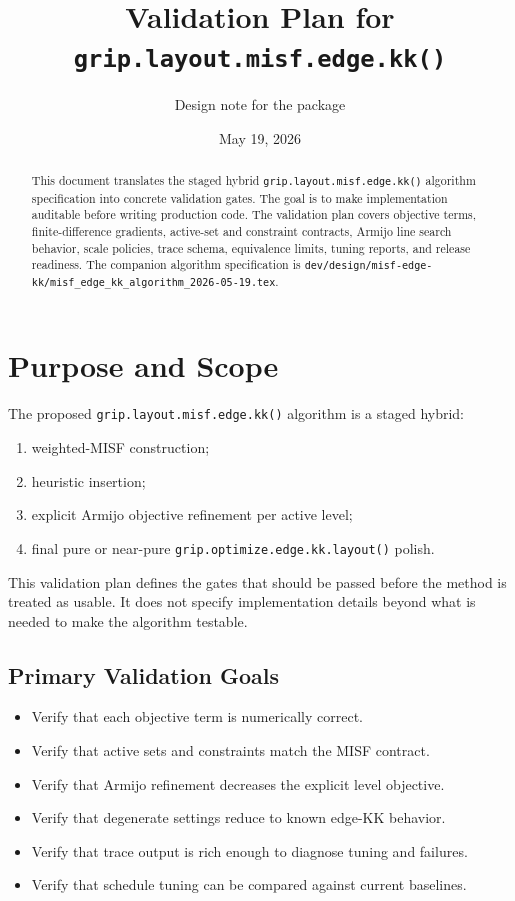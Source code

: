 \documentclass[11pt]{article}
\title{Validation Plan for \texttt{grip.layout.misf.edge.kk()}}
\author{Design note for the \grip{} package}
\date{May 19, 2026}
\newcommand{\Rfunc}[1]{\texttt{#1}}
\begin{document}
\maketitle

\begin{abstract}
This document translates the staged hybrid
\Rfunc{grip.layout.misf.edge.kk()} algorithm specification into concrete
validation gates. The goal is to make implementation auditable before writing
production code. The validation plan covers objective terms, finite-difference
gradients, active-set and constraint contracts, Armijo line search behavior,
scale policies, trace schema, equivalence limits, tuning reports, and release
readiness. The companion algorithm specification is
\texttt{dev/design/misf-edge-kk/misf\_edge\_kk\_algorithm\_2026-05-19.tex}.
\end{abstract}

\tableofcontents

\section{Purpose and Scope}

The proposed \Rfunc{grip.layout.misf.edge.kk()} algorithm is a staged hybrid:
\begin{enumerate}[leftmargin=2em]
  \item weighted-MISF construction;
  \item heuristic insertion;
  \item explicit Armijo objective refinement per active level;
  \item final pure or near-pure \Rfunc{grip.optimize.edge.kk.layout()} polish.
\end{enumerate}

This validation plan defines the gates that should be passed before the method
is treated as usable. It does not specify implementation details beyond what is
needed to make the algorithm testable.

\subsection{Primary Validation Goals}

\begin{itemize}[leftmargin=2em]
  \item Verify that each objective term is numerically correct.
  \item Verify that active sets and constraints match the MISF contract.
  \item Verify that Armijo refinement decreases the explicit level objective.
  \item Verify that degenerate settings reduce to known edge-KK behavior.
  \item Verify that trace output is rich enough to diagnose tuning and failures.
  \item Verify that schedule tuning can be compared against current baselines.
\end{itemize}
\end{document}
